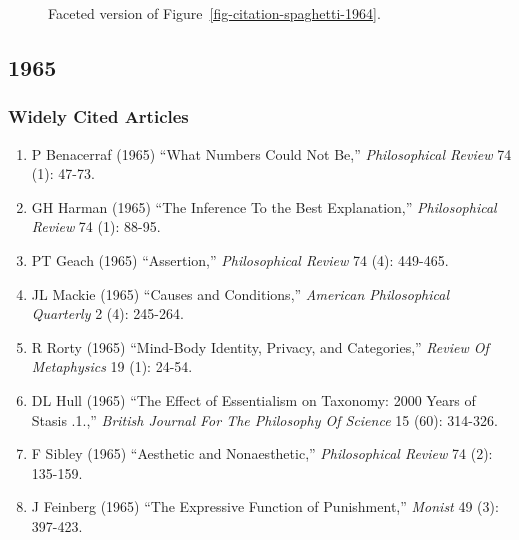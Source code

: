 \documentclass[
  10pt,
  letterpaper,
  DIV=11,
  numbers=noendperiod,
  twoside]{scrartcl}
\providecommand{\tightlist}{%
  \setlength{\itemsep}{0pt}\setlength{\parskip}{0pt}}\usepackage{longtable,booktabs,array}
\begin{document}
\begin{figure}


\caption{\label{fig-citation-facet-1964}Faceted version of
Figure~\ref{fig-citation-spaghetti-1964}.}

\end{figure}%

\newpage

\subsection{1965}\label{sec-s1965}

\subsubsection*{Widely Cited Articles}\label{widely-cited-articles-9}

\begin{enumerate}
\def\labelenumi{\arabic{enumi}.}
\tightlist
\item
  P Benacerraf (1965) ``What Numbers Could Not Be,'' \emph{Philosophical
  Review} 74 (1): 47-73.
\item
  GH Harman (1965) ``The Inference To the Best Explanation,''
  \emph{Philosophical Review} 74 (1): 88-95.
\item
  PT Geach (1965) ``Assertion,'' \emph{Philosophical Review} 74 (4):
  449-465.
\item
  JL Mackie (1965) ``Causes and Conditions,'' \emph{American
  Philosophical Quarterly} 2 (4): 245-264.
\item
  R Rorty (1965) ``Mind-Body Identity, Privacy, and Categories,''
  \emph{Review Of Metaphysics} 19 (1): 24-54.
\item
  DL Hull (1965) ``The Effect of Essentialism on Taxonomy: 2000 Years of
  Stasis .1.,'' \emph{British Journal For The Philosophy Of Science} 15
  (60): 314-326.
\item
  F Sibley (1965) ``Aesthetic and Nonaesthetic,'' \emph{Philosophical
  Review} 74 (2): 135-159.
\item
  J Feinberg (1965) ``The Expressive Function of Punishment,''
  \emph{Monist} 49 (3): 397-423.
\end{enumerate}
\end{document}
